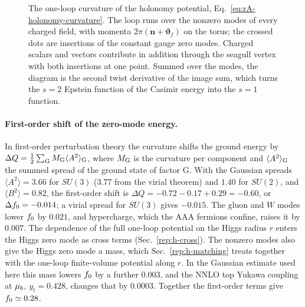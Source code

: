 \begin{figure}[tbp]
\centering
{}
\caption{The one-loop curvature of the holonomy potential, Eq.~\eqref{eq:rA-holonomy-curvature}.
The loop runs over the nonzero modes of every charged field, with momenta $2\pi(\bm n+\bm\vartheta_f)$ on the torus; the crossed dots are insertions of the constant gauge zero modes.
Charged scalars and vectors contribute in addition through the seagull vertex with both insertions at one point.
Summed over the modes, the diagram is the second twist derivative of the image sum, which turns the $s=2$ Epstein function of the Casimir energy into the $s=1$ function.}
\label{fig:rA-holonomy-loop}
\end{figure}

\paragraph{First-order shift of the zero-mode energy.}
In first-order perturbation theory the curvature shifts the ground energy by $\Delta Q=\tfrac12\sum_{\rm G}M_{\rm G}\langle A^2\rangle_{\rm G}$, where $M_{\rm G}$ is the curvature per component and $\langle A^2\rangle_{\rm G}$ the summed spread of the ground state of factor G.
With the Gaussian spreads $\langle A^2\rangle=3.66$ for $SU(3)$ ($3.77$ from the virial theorem) and $1.40$ for $SU(2)$, and $\langle B^2\rangle=0.82$, the first-order shift is $\Delta Q=-0.72-0.17+0.29=-0.60$, or $\Delta f_0=-0.014$; a virial spread for $SU(3)$ gives $-0.015$. %
The gluon and $W$ modes lower $f_0$ by $0.021$, and hypercharge, which the AAA fermions confine, raises it by $0.007$. %
The dependence of the full one-loop potential on the Higgs radius $r$ enters the Higgs zero mode as cross terms (Sec.~\ref{rep:h-cross}).
The nonzero modes also give the Higgs zero mode a mass, which Sec.~\ref{rep:h-matching} treats together with the one-loop finite-volume potential along $r$.
In the Gaussian estimate used here this mass lowers $f_0$ by a further $0.003$, and the NNLO top Yukawa coupling at $\mu_b$, $y_t=0.428$, changes that by $0.0003$. %
Together the first-order terms give $f_0\simeq0.28$. %

